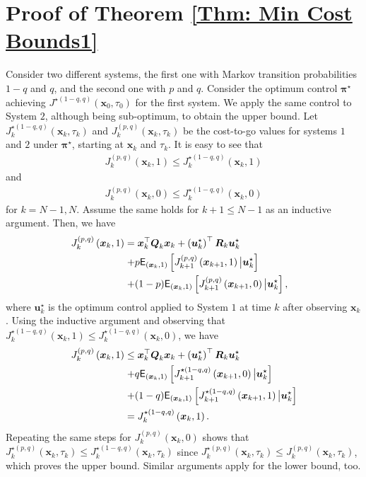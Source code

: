 \documentclass[10pt, journal, letterpaper]{IEEEtran}
\newcommand{\paren}[1]{\left(#1\right)}
\newcommand{\1}{\ensuremath{\mathbf{1}}} %
\newcommand{\ESI}[2]{\ensuremath{\mathsf{E}_{#2}\left[#1 \right]}}
\newcommand{\mincost}[2]{\ensuremath{J^{\star\paren{#1, #2}}}\paren{\vec{x}_0, \tau_0}}
\newcommand{\gocost}[3]{\ensuremath{J_{#3}^{\paren{#1, #2}}\paren{\vec{x}_{#3}, \tau_{#3}}}}
\newcommand{\gocostON}[3]{\ensuremath{J_{#3}^{\paren{#1, #2}}\paren{\vec{x}_{#3}, 1}}}
\newcommand{\gocostOFF}[3]{\ensuremath{J_{#3}^{\paren{#1, #2}}\paren{\vec{x}_{#3}, 0}}}
\newcommand{\mingocost}[3]{\ensuremath{J_{#3}^{\star \paren{#1, #2}}\paren{\vec{x}_{#3}, \tau_{#3}}}}
\newcommand{\mingocostON}[3]{\ensuremath{J_{#3}^{\star \paren{#1, #2}}\paren{\vec{x}_{#3}, 1}}}
\newcommand{\mingocostOFF}[3]{\ensuremath{J_{#3}^{\star \paren{#1, #2}}\paren{\vec{x}_{#3}, 0}}}
\renewcommand{\vec}[1]{\ensuremath{\boldsymbol{#1}}} %
\begin{document}
\appendices
\section{Proof of Theorem \ref{Thm: Min Cost Bounds1}} \label{Appendix: Bounds 1}
Consider two different systems, the first one with Markov transition probabilities $1-q$ and $q$, and the second one with $p$ and $q$. Consider the optimum control $\vec{\pi}^\star$ achieving $\mincost{1-q}{q}$ for the first system. We apply the same control to System $2$, although being sub-optimum, to obtain the upper bound. Let $\mingocost{1-q}{q}{k}$ and $\gocost{p}{q}{k}$ be the cost-to-go values for systems $1$ and $2$ under $\vec{\pi}^\star$, starting at $\vec{x}_k$ and $\tau_k$. It is easy to see that
\begin{eqnarray}
\gocostON{p}{q}{k} \leq \mingocostON{1-q}{q}{k}
\end{eqnarray}
and
\begin{eqnarray}
\gocostOFF{p}{q}{k} \leq \mingocostOFF{1-q}{q}{k}
\end{eqnarray}
for $k=N-1, N$. Assume the same holds for $k+1 \leq N-1$ as an inductive argument. Then, we have
\begin{eqnarray*}
\lefteqn{\gocostON{p}{q}{k} = \vec{x}_k^\top \vec{Q}_k \vec{x}_k + \paren{\vec{u}_k^\star}^\top \vec{R}_k \vec{u}_k^\star} \hspace{8.0cm} \\
\lefteqn{+ p \ESI{\gocostON{p}{q}{k+1} \big| \vec{u}_k^\star}{\paren{\vec{x}_k, 1}}} \hspace{6.0cm} \\
\lefteqn{+ (1-p) \ESI{\gocostOFF{p}{q}{k+1} \big| \vec{u}_k^\star}{\paren{\vec{x}_k, 1}},} \hspace{6.0cm}
\end{eqnarray*}
where $\vec{u}_k^\star$ is the optimum control applied to System $1$ at time $k$ after observing $\vec{x}_k$. Using the inductive argument and observing that $\mingocostON{1-q}{q}{k} \leq \mingocostOFF{1-q}{q}{k}$, we have
\begin{eqnarray*}
\lefteqn{\gocostON{p}{q}{k} \leq \vec{x}_k^\top \vec{Q}_k \vec{x}_k + \paren{\vec{u}_k^\star}^\top \vec{R}_k \vec{u}_k^\star} \hspace{8.0cm} \\
\lefteqn{+ q \ESI{\mingocostOFF{1-q}{q}{k+1} \big| \vec{u}_k^\star}{\paren{\vec{x}_k, 1}}} \hspace{6.0cm} \\
\lefteqn{+ (1-q) \ESI{\mingocostON{1-q}{q}{k+1} \big| \vec{u}_k^\star}{\paren{\vec{x}_k, 1}}} \hspace{6.0cm} \\
\lefteqn{= \mingocostON{1-q}{q}{k}.} \hspace{6.0cm}
\end{eqnarray*}
Repeating the same steps for $\gocostOFF{p}{q}{k}$ shows that $ \mingocost{p}{q}{k} \leq \mingocost{1-q}{q}{k}$ since $\mingocost{p}{q}{k} \leq \gocost{p}{q}{k}$, which proves the upper bound. Similar arguments apply for the lower bound, too.
\end{document}
